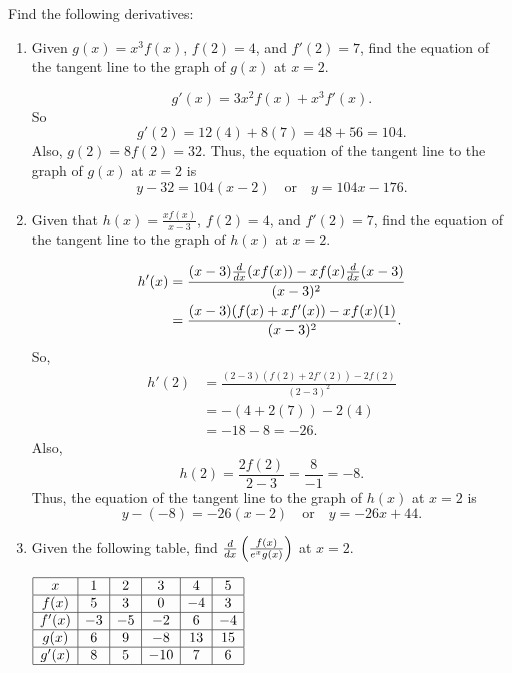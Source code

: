 \documentclass[nooutcomes]{ximera}
\begin{document}
\begin{problem}
Find the following derivatives:
	\begin{enumerate}
	
	\item  Given $g(x) = x^3 f(x)$, $f(2) = 4$, and $f'(2) = 7$, find the equation of the tangent line to the graph of $g(x)$ at $x=2$.
		\begin{freeResponse}
		$$g'(x) = 3x^2 f(x) + x^3 f'(x).$$  
		So 
		$$g'(2) = 12(4) + 8(7) = 48 + 56 = 104.$$  
		Also, $g(2) = 8f(2) = 32$.  Thus, the equation of the tangent line to the graph of $g(x)$ at $x=2$ is
		$$y-32 = 104(x-2) \quad \text{or} \quad y = 104x - 176.$$  
		\end{freeResponse}
		
		
		
	\item  Given that $h(x) = \frac{x f(x)}{x-3}$, $f(2) = 4$, and $f'(2) = 7$, find the equation of the tangent line to the graph of $h(x)$ at $x=2$.  
		\begin{freeResponse}
		\begin{align*}
		h'(x) &= \frac{ (x-3)\frac{d}{dx}(xf(x)) - xf(x)\frac{d}{dx}(x-3)}{(x-3)^2}  \\
		&= \frac{(x-3)(f(x) + xf'(x)) - xf(x)(1)}{(x-3)^2}.
		\end{align*}
		So, 
		\begin{align*}
		h'(2) &= \frac{(2-3)(f(2) + 2f'(2)) - 2f(2)}{(2-3)^2}  \\
		&= -(4 + 2(7)) - 2(4)  \\
		&= -18 - 8 = -26.
		\end{align*}
		Also, 
		$$h(2) = \frac{2f(2)}{2-3} = \frac{8}{-1} = -8.$$  
		Thus, the equation of the tangent line to the graph of $h(x)$ at $x=2$ is
		$$y-(-8) = -26(x-2) \quad \text{or} \quad y = -26x + 44.$$  
		\end{freeResponse}
		
		
		
	\item  Given the following table, find $\frac{d}{dx} \left( \frac{f(x)}{e^x g(x)} \right)$ at $x=2$. 
	
	$\begin{array}{|c|c|c|c|c|c|}
	\hline
	x	&	1	&	2	&	3	&	4	&	5	\\
	\hline
	f(x)	&	5	&	3	&	0	&	-4	&	3	\\
	\hline
	f'(x)	&	-3	&	-5	&	-2	&	6	&	-4	\\
	\hline
	g(x)	&	6	&	9	&	-8	&	13	&	15	\\
	\hline
	g'(x)	&	8	&	5	&	-10	&	7	&	6	\\
	\hline
	\end{array}$
	

\end{enumerate}
\end{problem}
\end{document}
